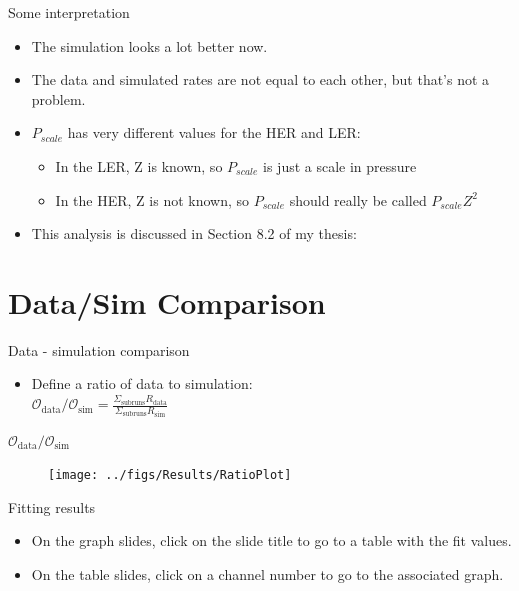 \documentclass[xcolor=dvipsnames]{beamer}
\begin{document}
\begin{frame}{Some interpretation}
\begin{itemize}
	\item
	The simulation looks a lot better now.
	\item
	The data and simulated rates are not equal to each other, but that's not a problem.
	\item
	$P_{scale}$ has very different values for the HER and LER:
	\begin{itemize}
		\item
		In the LER, Z is known, so $P_{scale}$ is just a scale in pressure
		\item
		In the HER, Z is not known, so $P_{scale}$ should really be called $P_{scale}Z^2$
	\end{itemize}	
	\item
	This analysis is discussed in Section 8.2 of my thesis: \href{https://www.dropbox.com/s/jji6kuvv6u854s7/mainthesisUVIC.pdf?dl=0}{\color{blue}{Dropbox link}}

\end{itemize}
\end{frame}

\section{Data/Sim Comparison}

\begin{frame}{Data - simulation comparison}
\begin{itemize}
	\item
	Define a ratio of data to simulation:
	\\ \Large
	$\mathcal{O}_{\mathrm{data}}/\mathcal{O}_{\mathrm{sim}} = \frac{\Sigma_{\mathrm{subruns}} R_{\mathrm{data}}}{\Sigma_{\mathrm{subruns}} R_{\mathrm{sim}}}$

\end{itemize}
\end{frame}


\begin{frame}{$\mathcal{O}_{\mathrm{data}}/\mathcal{O}_{\mathrm{sim}}$}
\begin{figure}	
	\texttt{[image: ../figs/Results/RatioPlot]}
\end{figure}
\end{frame}



\appendix
\backupbegin

\begin{frame}
\begin{center}
\Huge Fitting results
\vspace{0.5cm}
\normalsize
\begin{itemize}
	\item
	On the graph slides, click on the slide title to go to a table with the fit values.
	\item
	On the table slides, click on a channel number to go to the associated graph.
\end{itemize}
\end{center}
\end{frame}
\end{document}

